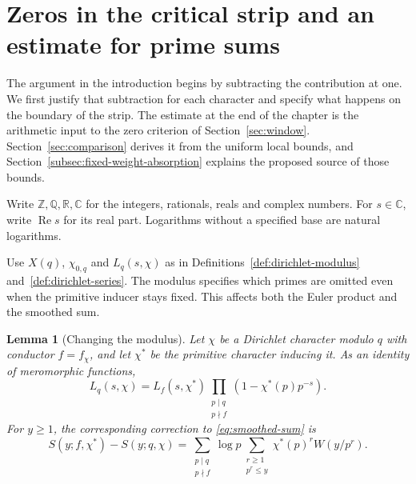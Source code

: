 \documentclass[11pt]{article}
\newtheorem{auxlemma}{Lemma}[section]
\theoremstyle{definition}
\theoremstyle{plain}
\newcommand{\R}{\mathbb R}
\newcommand{\C}{\mathbb C}
\newcommand{\RePart}{\operatorname{Re}}
\newcommand{\Q}{\mathbb Q}
\newcommand{\Z}{\mathbb Z}
\begin{document}
\let\originalsubsubsection\subsubsection
\newcommand{\listedsubsubsection}[1]{%
  \originalsubsubsection*{#1}\addcontentsline{toc}{subsubsection}{#1}}
\makeatletter
\renewcommand{\@pnumwidth}{2.6em}
\renewcommand{\@tocrmarg}{3.4em}
\renewcommand*{\l@subsubsection}{\@dottedtocline{3}{3.8em}{4em}}
\renewcommand{\subsubsection}{\@ifstar\listedsubsubsection\originalsubsubsection}
\makeatother
\setcounter{tocdepth}{4}
\tableofcontents
\clearpage



\section{Zeros in the critical strip and an estimate for prime sums}
\label{sec:statements}

The argument in the introduction begins by subtracting the contribution at one. We
first justify that subtraction for each character and specify what happens on the
boundary of the strip. The estimate at the end of the chapter
is the arithmetic input to the zero criterion of Section~\ref{sec:window}. Section~\ref{sec:comparison} derives it from the uniform local bounds, and Section~\ref{subsec:fixed-weight-absorption} explains the proposed source of those bounds.

Write \(\Z,\Q,\R,\C\) for the integers, rationals, reals and
complex numbers. For \(s\in\C\), write \(\RePart s\) for its real
part. Logarithms without a specified base are natural logarithms.

Use \(X(q)\), \(\chi_{0,q}\) and \(L_q(s,\chi)\) as in
Definitions~\ref{def:dirichlet-modulus} and~\ref{def:dirichlet-series}.
The modulus specifies which primes are omitted even when the primitive
inducer stays fixed. This affects both the Euler product and the smoothed
sum.

\begin{auxlemma}[Changing the modulus]\label{lem:analytic-change-modulus}
Let \(\chi\) be a Dirichlet character modulo \(q\) with conductor \(f=f_\chi\),
and let \(\chi^*\) be the primitive character inducing it. As an identity of meromorphic functions,
\begin{equation}\label{eq:imprimitive-euler-factors}
 L_q(s,\chi)=L_f(s,\chi^*)
       \prod_{\substack{p\mid q\\p\nmid f}}(1-\chi^*(p)p^{-s}).
\end{equation}
For \(y\ge1\), the corresponding correction to \eqref{eq:smoothed-sum} is
\[
 S(y;f,\chi^*)-S(y;q,\chi)=
 \sum_{\substack{p\mid q\\p\nmid f}}\log p
       \sum_{\substack{r\ge1\\p^r\le y}}\chi^*(p)^r W(y/p^r).
\]
\end{auxlemma}
\end{document}
